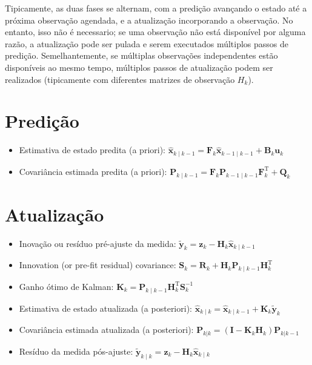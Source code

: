 Tipicamente, as duas fases se alternam, com a predição avançando o estado até a próxima observação agendada, e a atualização incorporando a observação. No entanto, isso não é necessario; se uma observação não está disponível por alguma razão, a atualização pode ser pulada e serem executados múltiplos passos de predição. Semelhantemente, se múltiplas observações independentes estão disponíveis ao mesmo tempo, múltiplos passos de atualização podem ser realizados (tipicamente com diferentes matrizes de observação $H_k$).

\section{Predição}
\begin{itemize}
  \item Estimativa de estado predita (a priori): ${\displaystyle {\hat {\mathbf {x} }}_{k\mid k-1}=\mathbf {F} _{k}{\hat {\mathbf {x} }}_{k-1\mid k-1}+\mathbf {B} _{k}\mathbf {u} _{k}}$
  \item Covariância estimada predita (a priori): ${\displaystyle \mathbf {P} _{k\mid k-1}=\mathbf {F} _{k}\mathbf {P} _{k-1\mid k-1}\mathbf {F} _{k}^{\mathrm {T} }+\mathbf {Q} _{k}}$
\end{itemize}

\section{Atualização}
\begin{itemize}
  \item Inovação ou resíduo pré-ajuste da medida: ${\displaystyle {\tilde {\mathbf {y} }}_{k}=\mathbf {z} _{k}-\mathbf {H} _{k}{\hat {\mathbf {x} }}_{k\mid k-1}}$
  \item Innovation (or pre-fit residual) covariance: ${\displaystyle \mathbf {S} _{k}=\mathbf {R} _{k}+\mathbf {H} _{k}\mathbf {P} _{k\mid k-1}\mathbf {H} _{k}^{\mathrm {T} }}$
  \item Ganho ótimo de Kalman: ${\displaystyle \mathbf {K} _{k}=\mathbf {P} _{k\mid k-1}\mathbf {H} _{k}^{\mathrm {T} }\mathbf {S} _{k}^{-1}}$
  \item Estimativa de estado atualizada (a posteriori): ${\displaystyle {\hat {\mathbf {x} }}_{k\mid k}={\hat {\mathbf {x} }}_{k\mid k-1}+\mathbf {K} _{k}{\tilde {\mathbf {y} }}_{k}}$
  \item Covariância estimada atualizada (a posteriori): ${\displaystyle \mathbf {P} _{k|k}=(\mathbf {I} -\mathbf {K} _{k}\mathbf {H} _{k})\mathbf {P} _{k|k-1}}$
  \item Resíduo da medida pós-ajuste: ${\displaystyle {\tilde {\mathbf {y} }}_{k\mid k}=\mathbf {z} _{k}-\mathbf {H} _{k}{\hat {\mathbf {x} }}_{k\mid k}}$
\end{itemize}



